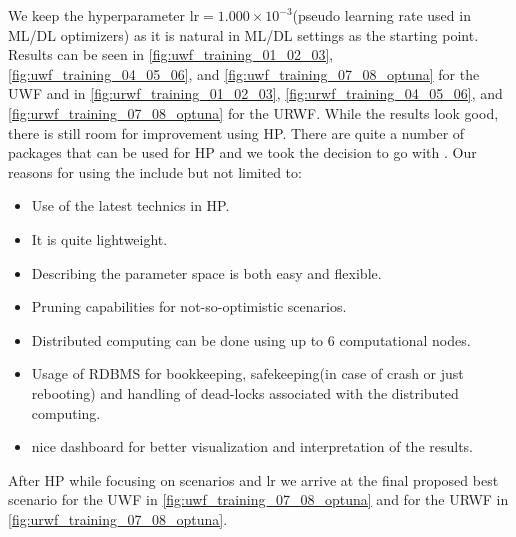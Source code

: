 We keep the hyperparameter $\mathrm{lr}=1.000\times10^{-3}$(pseudo learning rate used in \ac{ML}/\ac{DL} 
optimizers\cite{Abadi2016}\cite{Chollet2023}\cite{Paszke2019}\cite{Sun2019}) as it is natural in \ac{ML}/\ac{DL} 
settings as the starting point\cite{Abadi2016}\cite{Chollet2023}\cite{Paszke2019}. Results can be seen in 
\cref{fig:uwf_training_01_02_03}, \ref{fig:uwf_training_04_05_06}, and \ref{fig:uwf_training_07_08_optuna} for the 
\ac{UWF} and in \cref{fig:urwf_training_01_02_03}, \ref{fig:urwf_training_04_05_06}, and \ref{fig:urwf_training_07_08_optuna} 
for the \ac{URWF}. While the results look good, there is still room for improvement using \ac{HP}\cite{Hutter2019}\cite{Akiba2019}. 
There are quite a number of packages that can be used for \ac{HP}\cite{Hutter2019} and we took the decision to go with 
\optuna\cite{Akiba2019}\index{\optuna}. Our reasons for using the \optuna\cite{Akiba2019}\index{\optuna} include but not limited to:
\begin{itemize}
  \item Use of the latest technics in \ac{HP}\cite{Hutter2019}\cite{Akiba2019}.
  \item It is quite lightweight.
  \item Describing the parameter space is both easy and flexible.
  \item Pruning capabilities for not-so-optimistic scenarios.
  \item Distributed computing can be done using up to 6 computational nodes.
  \item Usage of \ac{RDBMS} for bookkeeping, safekeeping(in case of crash or just rebooting) and handling of dead-locks associated with the distributed computing.
  \item nice dashboard for better visualization and interpretation of the results.  
\end{itemize}
After \ac{HP}\cite{Hutter2019}\cite{Akiba2019} while focusing on scenarios and $\mathrm{lr}$ we arrive at the final proposed best scenario for the \ac{UWF} in 
\cref{fig:uwf_training_07_08_optuna} and for the \ac{URWF} in \cref{fig:urwf_training_07_08_optuna}.

